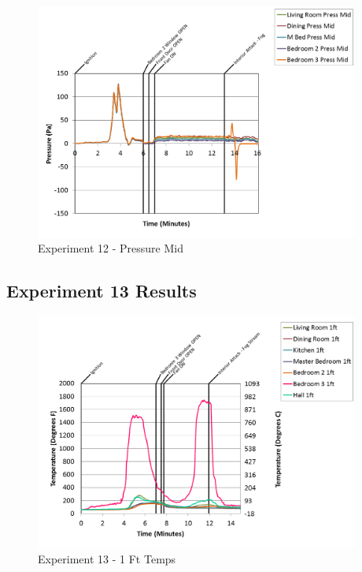 \documentclass{article}
\begin{document}
\begin{appendices}
\begin{figure}[h!]
	\centering
	\includegraphics[height=3.05in]{0_Images/Results_Charts/Exp_12_Charts/PressureMid.png}
	\caption{Experiment 12 - Pressure Mid}
\end{figure}

\clearpage

\clearpage
\clearpage		\large
\subsection{Experiment 13 Results} \label{App:Exp13Results} 

\begin{figure}[h!]
	\centering
	\includegraphics[height=3.05in]{0_Images/Results_Charts/Exp_13_Charts/1FtTemps.png}
	\caption{Experiment 13 - 1 Ft Temps}
\end{figure}



\end{appendices}
\end{document}
